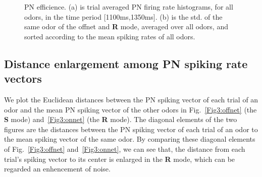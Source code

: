\documentclass[12pt, a4paper]{article}
\begin{document}
\begin{figure}[htbp]\centering
    \hspace{0.5cm}
    \subfigure[Selectivity]{\label{Fig2plus:selectivity}
    \begin{overpic}[scale=0.3]{figures/fig2plus/lifetimeSparseness.eps} \end{overpic}
    } %

\caption[PN~efficience]{\label{Figure2plus:PNefficience} \small PN efficience. (a) is trial averaged PN firing rate histograms, for all odors, in the time period [1100ms,1350ms]. (b) is the std. of the same odor of the offnet and {\bf R} mode, averaged over all odors, and sorted according to the mean spiking rates of all odors.}
\end{figure}


\subsection{Distance enlargement among PN spiking rate vectors} \label{Sect:distance}
We plot the Euclidean distances between the PN spiking vector of each trial of an odor and the mean PN spiking vector of the other odors in Fig.~\ref{Fig3:offnet} (the {\bf S} mode) and~\ref{Fig3:onnet} (the {\bf R} mode). The diagonal elements of the two figures are the distances between the PN spiking vector of each trial of an odor to the mean spiking vector of the same odor. By comparing these diagonal elements of Fig.~\ref{Fig3:offnet} and~\ref{Fig3:onnet}, we can see that, the distance from each trial's spiking vector to its center is enlarged in the {\bf R} mode, which can be regarded an enhencement of noise.
\end{document}
